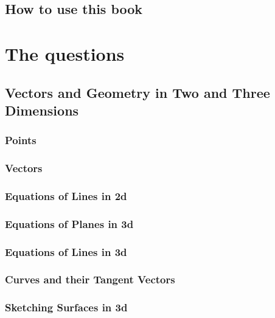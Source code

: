 \documentclass[12pt,a4paper, openany]{book}
\begin{document}
\frontmatter

\chapter{How to use this book}


\tableofcontents

\mainmatter

\part{The questions}


\chapter{Vectors and Geometry in Two and Three Dimensions}
\setcounter{section}{0}
\section{Points}

\section{Vectors}

\section{Equations of Lines in 2d}

\section{Equations of Planes in 3d}

\section{Equations of Lines in 3d}

\section{Curves and their Tangent Vectors}

\section{Sketching Surfaces in 3d}

%
%
\end{document}
